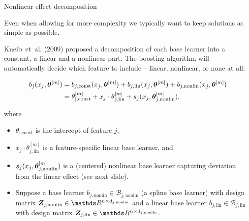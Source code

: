 \documentclass[11pt,compress,t,notes=noshow, xcolor=table]{beamer}
\begin{document}

%


\begin{vbframe}{Nonlinear effect decomposition}

Even when allowing for more complexity we typically want to keep solutions as
simple as possible.

\lz

Kneib~et~al. (2009) proposed a decomposition of each base learner into a
constant, a linear and a nonlinear part.
The boosting algorithm will automatically decide which feature to include --
linear, nonlinear, or none at all:

\vspace{-0.7cm}

\begin{align*}
b_j(x_j, \bm{\theta}^{[m]}) & = b_{j, \text{const}}(x_j, \bm{\theta}^{[m]}) + b_{j, \text{lin}}
(x_j, \bm{\theta}^{[m]}) + b_{j, \text{nonlin}}(x_j, \bm{\theta}^{[m]})\\
 & = \theta^{[m]}_\text{j,const} + x_j \cdot \theta^{[m]}_{j, \text{lin}} +
 s_j(x_j, \bm{\theta}^{[m]}_{j,\text{nonlin}}),
\end{align*}

\small
where
\begin{itemize}
  \small
  \item $\theta_\text{j,const}$ is the intercept of feature $j$,
  \item $x_j \cdot \theta^{[m]}_{j, \text{lin}}$ is a feature-specific linear
  base learner, and
  \item $s_j(x_j, \bm{\theta}^{[m]}_{j,\text{nonlin}})$ is a (centered) nonlinear base
  learner capturing deviation from the linear effect (see next slide).
\end{itemize}

\framebreak

\begin{itemize}
    \item 
        Suppose a base learner $b_{j,\text{nonlin}}\in\mathcal{B}_{j,\text{nonlin}}$ (a spline base learner) with design matrix $\bm{Z}_{j,\text{nonlin}}\in\R^{n\times d_{j,\text{nonlin}}}$ and a linear base learner $b_{j,\text{lin}}\in\mathcal{B}_{j,\text{lin}}$ with design matrix $\bm{Z}_{j,\text{lin}}\in\R^{n\times d_{j,\text{nonlin}}}$.


\end{itemize}
\end{vbframe}
\end{document}
